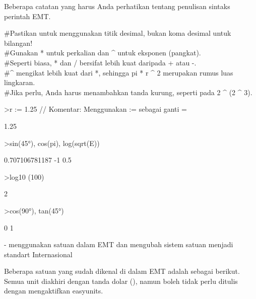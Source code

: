 \documentclass[a4paper,10pt]{article}
\begin{document}
\begin{eulernotebook}
\begin{eulercomment}
\begin{eulercomment}
\begin{eulercomment}
Beberapa catatan yang harus Anda perhatikan tentang penulisan sintaks
perintah EMT.

#Pastikan untuk menggunakan titik desimal, bukan koma desimal untuk
bilangan!\\
#Gunakan * untuk perkalian dan \textasciicircum{} untuk eksponen (pangkat).\\
#Seperti biasa, * dan / bersifat lebih kuat daripada + atau -.\\
#\textasciicircum{} mengikat lebih kuat dari *, sehingga pi * r \textasciicircum{} 2 merupakan rumus
luas lingkaran.\\
#Jika perlu, Anda harus menambahkan tanda kurung, seperti pada 2 \textasciicircum{} (2
\textasciicircum{} 3).
\end{eulercomment}
\begin{eulerprompt}
>r := 1.25 // Komentar: Menggunakan  := sebagai ganti =
\end{eulerprompt}
\begin{euleroutput}
  1.25
\end{euleroutput}
\begin{eulerprompt}
>sin(45°), cos(pi), log(sqrt(E))
\end{eulerprompt}
\begin{euleroutput}
  0.707106781187
  -1
  0.5
\end{euleroutput}
\begin{eulerprompt}
>log10 (100)
\end{eulerprompt}
\begin{euleroutput}
  2
\end{euleroutput}
\begin{eulerprompt}
>cos(90°), tan(45°)
\end{eulerprompt}
\begin{euleroutput}
  0
  1
\end{euleroutput}
\begin{eulercomment}
- menggunakan satuan dalam EMT dan mengubah sistem satuan menjadi
standart Internasional

Beberapa satuan yang sudah dikenal di dalam EMT adalah sebagai
berikut. Semua unit diakhiri dengan tanda dolar (\textdollar{}), namun boleh tidak
perlu ditulis dengan mengaktifkan easyunits.


\end{eulercomment}
\end{eulercomment}
\end{eulercomment}
\end{eulernotebook}
\end{document}

